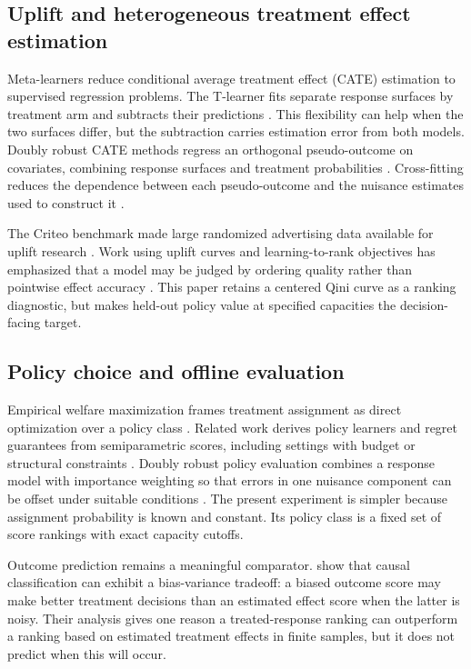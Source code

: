 \documentclass[11pt]{article}
\begin{document}
\subsection{Uplift and heterogeneous treatment effect estimation}

Meta-learners reduce conditional average treatment effect (CATE) estimation to supervised regression problems. The T-learner fits separate response surfaces by treatment arm and subtracts their predictions \citep{kunzel2019metalearners}. This flexibility can help when the two surfaces differ, but the subtraction carries estimation error from both models. Doubly robust CATE methods regress an orthogonal pseudo-outcome on covariates, combining response surfaces and treatment probabilities \citep{kennedy2023dr}. Cross-fitting reduces the dependence between each pseudo-outcome and the nuisance estimates used to construct it \citep{chernozhukov2018dml}.

The Criteo benchmark made large randomized advertising data available for uplift research \citep{diemert2018benchmark,diemert2021benchmark}. Work using uplift curves and learning-to-rank objectives has emphasized that a model may be judged by ordering quality rather than pointwise effect accuracy \citep{betlei2021uplift,devriendt2022rank}. This paper retains a centered Qini curve as a ranking diagnostic, but makes held-out policy value at specified capacities the decision-facing target.

\subsection{Policy choice and offline evaluation}

Empirical welfare maximization frames treatment assignment as direct optimization over a policy class \citep{kitagawa2018treatment}. Related work derives policy learners and regret guarantees from semiparametric scores, including settings with budget or structural constraints \citep{athey2021policy}. Doubly robust policy evaluation combines a response model with importance weighting so that errors in one nuisance component can be offset under suitable conditions \citep{dudik2011dr}. The present experiment is simpler because assignment probability is known and constant. Its policy class is a fixed set of score rankings with exact capacity cutoffs.

Outcome prediction remains a meaningful comparator. \citet{fernandezloria2022causal} show that causal classification can exhibit a bias-variance tradeoff: a biased outcome score may make better treatment decisions than an estimated effect score when the latter is noisy. Their analysis gives one reason a treated-response ranking can outperform a ranking based on estimated treatment effects in finite samples, but it does not predict when this will occur.
\end{document}
